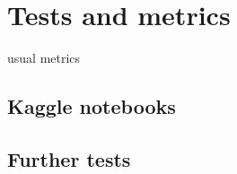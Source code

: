 \section*{Tests and metrics}

usual metrics

\subsection*{Kaggle notebooks}

\subsection*{Further tests}